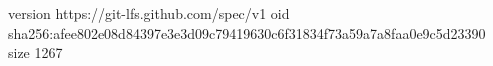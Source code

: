 version https://git-lfs.github.com/spec/v1
oid sha256:afee802e08d84397e3e3d09c79419630c6f31834f73a59a7a8faa0e9c5d23390
size 1267
